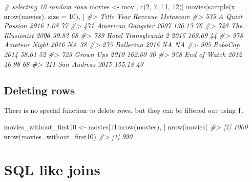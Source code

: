 \documentclass[
]{book}
\newenvironment{Shaded}{\begin{snugshade}}{\end{snugshade}}
\newcommand{\AttributeTok}[1]{\textcolor[rgb]{0.77,0.63,0.00}{#1}}
\newcommand{\CommentTok}[1]{\textcolor[rgb]{0.56,0.35,0.01}{\textit{#1}}}
\newcommand{\DecValTok}[1]{\textcolor[rgb]{0.00,0.00,0.81}{#1}}
\newcommand{\FunctionTok}[1]{\textcolor[rgb]{0.00,0.00,0.00}{#1}}
\newcommand{\NormalTok}[1]{#1}
\newcommand{\OtherTok}[1]{\textcolor[rgb]{0.56,0.35,0.01}{#1}}
\newcommand{\SpecialCharTok}[1]{\textcolor[rgb]{0.00,0.00,0.00}{#1}}
\begin{document}
\begin{Shaded}
\begin{Highlighting}[]
\CommentTok{\# selecting 10 random rows}
\NormalTok{movies }\OtherTok{\textless{}{-}}\NormalTok{ mov[, }\FunctionTok{c}\NormalTok{(}\DecValTok{2}\NormalTok{, }\DecValTok{7}\NormalTok{, }\DecValTok{11}\NormalTok{, }\DecValTok{12}\NormalTok{)]}
\NormalTok{movies[}\FunctionTok{sample}\NormalTok{(}\AttributeTok{x =} \FunctionTok{nrow}\NormalTok{(movies), }\AttributeTok{size =} \DecValTok{10}\NormalTok{), ]}
\CommentTok{\#\textgreater{}                    Title Year Revenue Metascore}
\CommentTok{\#\textgreater{} 535      A Quiet Passion 2016    1.08        77}
\CommentTok{\#\textgreater{} 471    American Gangster 2007  130.13        76}
\CommentTok{\#\textgreater{} 728      The Illusionist 2006   39.83        68}
\CommentTok{\#\textgreater{} 789 Hotel Transylvania 2 2015  169.69        44}
\CommentTok{\#\textgreater{} 978        Amateur Night 2016      NA        38}
\CommentTok{\#\textgreater{} 275            Ballerina 2016      NA        NA}
\CommentTok{\#\textgreater{} 905              RoboCop 2014   58.61        52}
\CommentTok{\#\textgreater{} 723            Grown Ups 2010  162.00        30}
\CommentTok{\#\textgreater{} 958         End of Watch 2012   40.98        68}
\CommentTok{\#\textgreater{} 211          San Andreas 2015  155.18        43}
\end{Highlighting}
\end{Shaded}

\hypertarget{deleting-rows}{%
\subsection{Deleting rows}\label{deleting-rows}}

There is no special function to delete rows, but they can be filtered out using \texttt{{[}}.

\begin{Shaded}
\begin{Highlighting}[]
\NormalTok{movies\_without\_first10 }\OtherTok{\textless{}{-}}\NormalTok{ movies[}\DecValTok{11}\SpecialCharTok{:}\FunctionTok{nrow}\NormalTok{(movies), ]}
\FunctionTok{nrow}\NormalTok{(movies)}
\CommentTok{\#\textgreater{} [1] 1000}
\FunctionTok{nrow}\NormalTok{(movies\_without\_first10)}
\CommentTok{\#\textgreater{} [1] 990}
\end{Highlighting}
\end{Shaded}

\hypertarget{sql-like-joins}{%
\section{SQL like joins}\label{sql-like-joins}}
\end{document}
